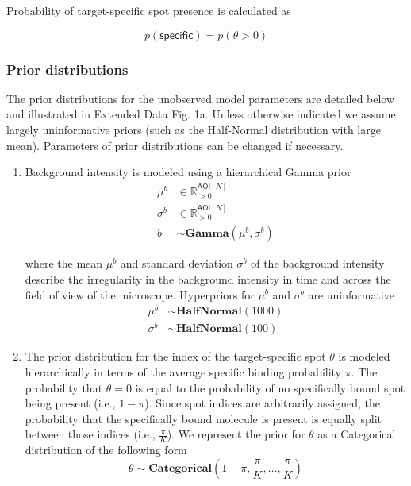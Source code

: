 Probability of target-specific spot presence is calculated as

\begin{equation}
    p(\mathsf{specific}) = p(\theta > 0)
\end{equation}

\subsubsection*{Prior distributions}

The prior distributions for the unobserved model parameters are detailed below and illustrated in Extended Data Fig. 1a. Unless otherwise indicated we assume largely uninformative priors (such as the Half-Normal distribution with large mean). Parameters of prior distributions can be changed if necessary.
%
\begin{enumerate}
    \item Background intensity is modeled using a hierarchical Gamma prior
%
\begin{subequations}
\begin{align}
    \mu^b &\in \mathbb{R}_{>0}^{\mathsf{AOI}[N]} \\
    \sigma^b &\in \mathbb{R}_{>0}^{\mathsf{AOI}[N]} \\
    b &\sim \mathbf{Gamma}(\mu^b, \sigma^b)
\end{align}
\end{subequations}

\noindent
where the mean $\mu^b$ and standard deviation $\sigma^b$ of the background intensity describe the irregularity in the background intensity in time and across the field of view of the microscope. Hyperpriors for $\mu^b$ and $\sigma^b$ are uninformative
%
\begin{subequations}
\begin{align}
    \mu^b &\sim \mathbf{HalfNormal}(1000) \\
    \sigma^b &\sim \mathbf{HalfNormal}(100)
\end{align}
\end{subequations}

\item The prior distribution for the index of the target-specific spot $\theta$ is modeled hierarchically in terms of the average specific binding probability $\pi$. The probability that $\theta = 0$ is equal to the probability of no specifically bound spot being present (i.e., $1-\pi$). Since spot indices are arbitrarily assigned, the probability that the specifically bound molecule is present is equally split between those indices (i.e., $\frac{\pi}{K}$). We represent the prior for $\theta$ as a Categorical distribution of the following form
%
\begin{equation}
    \theta \sim \mathbf{Categorical}\left(1 - \pi, \frac{\pi}{K}, \dots, \frac{\pi}{K}\right)
\end{equation}


\end{enumerate}
